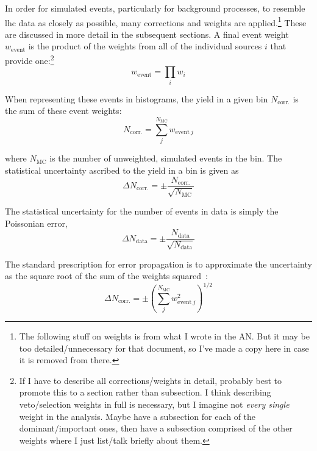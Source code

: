 In order for simulated events, particularly for background processes, to resemble \acrshort{lhc} data as closely as possible, many corrections and weights are applied.\footnote{The following stuff on weights is from what I wrote in the AN. But it may be too detailed/unnecessary for that document, so I've made a copy here in case it is removed from there.} These are discussed in more detail in the subsequent sections. A final event weight $w_{\mathrm{event}}$ is the product of the weights from all of the individual sources $i$ that provide one:\footnote{If I have to describe all corrections/weights in detail, probably best to promote this to a section rather than subsection. I think describing veto/selection weights in full is necessary, but I imagine not \emph{every single} weight in the analysis. Maybe have a subsection for each of the dominant/important ones, then have a subsection comprised of the other weights where I just list/talk briefly about them.}
\begin{equation}
    w_{\mathrm{event}} = \prod_i w_i
    \label{eq:event_weight}
\end{equation}

When representing these events in histograms, the yield in a given bin $N_{\mathrm{corr.}}$ is the sum of these event weights:
\begin{equation}
    N_{\mathrm{corr.}} = \sum_j^{N_{\mathrm{MC}}} w_{\mathrm{event} \ j}
    \label{eq:bin_weight}
\end{equation}

where $N_{\mathrm{MC}}$ is the number of unweighted, simulated events in the bin. The statistical uncertainty ascribed to the yield in a bin is given as
\begin{equation}
    \Delta N_{\mathrm{corr.}} = \pm \frac{ N_{\mathrm{corr.}} }{ \sqrt{N_{\mathrm{MC}}} }
    \label{eq:uncertainty_mc_ours}
\end{equation}

The statistical uncertainty for the number of events in data is simply the Poissonian error,
\begin{equation}
    \Delta N_{\mathrm{data}} = \pm \frac{ N_{\mathrm{data}} }{ \sqrt{N_{\mathrm{data}}} }
    \label{eq:uncertainty_data}
\end{equation}

The standard prescription for error propagation is to approximate the uncertainty as the square root of the sum of the weights squared~\cite{bevington2003data}:
\begin{equation}
    \Delta N_{\mathrm{corr.}} = \pm \left( \sum_j^{N_{\mathrm{MC}}} w_{\mathrm{event} \ j}^2 \right) ^{1/2}
    \label{eq:uncertainty_mc_normal}
\end{equation}


